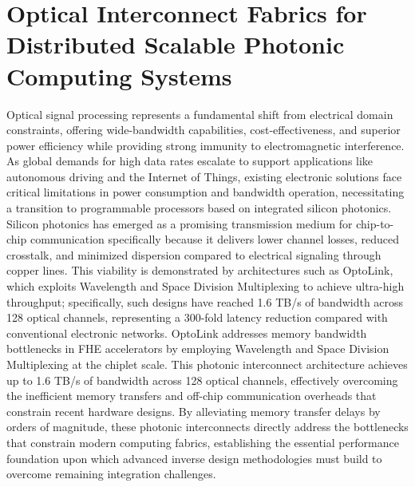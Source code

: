 \section{Optical Interconnect Fabrics for Distributed Scalable Photonic Computing Systems}\label{optical-interconnect-fabrics-for-distributed-scalable-photonic-computing-systems}

Optical signal processing represents a fundamental shift from electrical domain constraints, offering wide-bandwidth capabilities, cost-effectiveness, and superior power efficiency while providing strong immunity to electromagnetic interference. As global demands for high data rates escalate to support applications like autonomous driving and the Internet of Things, existing electronic solutions face critical limitations in power consumption and bandwidth operation, necessitating a transition to programmable processors based on integrated silicon photonics. Silicon photonics has emerged as a promising transmission medium for chip-to-chip communication specifically because it delivers lower channel losses, reduced crosstalk, and minimized dispersion compared to electrical signaling through copper lines. This viability is demonstrated by architectures such as OptoLink, which exploits Wavelength and Space Division Multiplexing to achieve ultra-high throughput; specifically, such designs have reached 1.6 TB/s of bandwidth across 128 optical channels, representing a 300-fold latency reduction compared with conventional electronic networks. OptoLink addresses memory bandwidth bottlenecks in FHE accelerators by employing Wavelength and Space Division Multiplexing at the chiplet scale. This photonic interconnect architecture achieves up to 1.6 TB/s of bandwidth across 128 optical channels, effectively overcoming the inefficient memory transfers and off-chip communication overheads that constrain recent hardware designs. \citep{doi_10_1145_3806395_315ab915} By alleviating memory transfer delays by orders of magnitude, these photonic interconnects directly address the bottlenecks that constrain modern computing fabrics, establishing the essential performance foundation upon which advanced inverse design methodologies must build to overcome remaining integration challenges. \citep{doi_10_1109_access_2020_3013116_8fec1fb2} \citep{doi_10_1145_3806395_315ab915} \citep{doi_10_1007_s11082_024_08009_8_0f7f241e}

